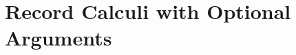 \begin{comment}
\paragraph{Compilation of feature-oriented programming.}
\emph{Feature-oriented programming}
(FOP)~\citep{prehofer1997feature,apel2009overview} is a programming paradigm
that aims to modularize features in software product
lines~\citep{apel2013feature}. There is a debate on what modularity exactly
means, and \citet{kastner2011road} mention two notions of modularity:
\emph{cohesion} and \emph{information hiding}. The majority of FOP
work~\citep{batory2004scaling,apel2005featurec++,apel2013language} focuses on
the notion of cohesion and basically does source-to-source transformations,
which hinders modular type checking and separate compilation. There is some
other work, such as Jiazzi~\citep{mcdirmid2001jiazzi} and
Scala~\citep{odersky2005scalable}, leveraging information hiding instead and
supporting modular type checking and separate compilation. However, FOP is
usually achieved via verbose design patterns or metaprogramming in those
languages. For instance, some precursor work of compositional programming, done
in Scala, employs design patterns based on object
algebras~\citep{oliveira2012extensibility} to achieve
FOP~\citep{oliveira2013feature,rendel2014object}. Since merging is not directly
supported in Scala, specialized composition operators are required to simulate
merges for different object algebra interfaces. The creation and use of those
composition operators cause a significant burden for developing programs. In
contrast, CP natively supports merges, eliminating the need for such specialized
composition operators and supporting FOP more directly.

\emph{Delta-oriented programming}
(DOP)~\citep{schaefer2010delta} is an extension of FOP, which features delta
modules that can add, remove, or modify classes. A feature module is a delta
module without the remove operation. DOP supports compositional type
checking~\citep{bettini2013compositional} at the level of source code. More
recently, a core calculus for \emph{dynamic} DOP is proposed by
\citet{damiani2018core} to support runtime
variability~\citep{hallsteinsen2008dynamic} and is proven to be type-safe.
However, dynamic DOP is not yet implemented, and its separation compilation is
unexplored.
\end{comment}

\section{Record Calculi with Optional Arguments}

